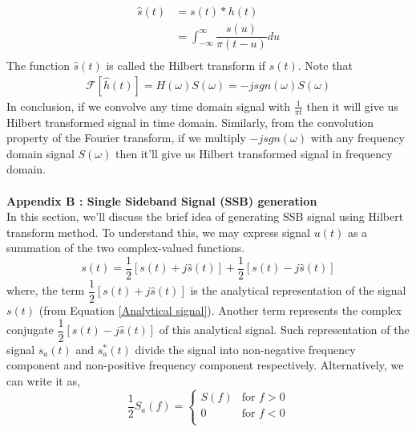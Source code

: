 \begin{equation}
\begin{split}
\hat{s}(t)&=s(t) * h(t)\\
		  &=\int_{-\infty}^{\infty} \dfrac{s(u)}{\pi(t-u)}du\\
\end{split}
\label{}
\end{equation}
The function $\hat{s}(t)$ is called the Hilbert transform if $s(t)$. Note that
\begin{equation}
\begin{split}
\mathcal{F}[\hat{h}(t)]=H(\omega)S(\omega)=-jsgn(\omega)S(\omega)
\end{split}
\label{}
\end{equation}
In conclusion, if we convolve any time domain signal with $\frac{1}{\pi t}$ then it will give us Hilbert transformed signal in time domain. Similarly, from the convolution property of the Fourier transform, if we multiply $-jsgn(\omega)$ with any frequency domain signal $S(\omega)$ then it'll give us Hilbert transformed signal in frequency domain.
\\
\\
\textbf{Appendix B : Single Sideband Signal (SSB) generation}\\
In this section, we'll discuss the brief idea of generating SSB signal using Hilbert transform method. To understand this, we may express signal $u(t)$ as a summation of the two complex-valued functions.
\begin{equation}
s(t)=\dfrac{1}{2}[s(t)+j\hat{s}(t)]+\dfrac{1}{2}[s(t)-j\hat{s}(t)]
\label{}
\end{equation}
where, the term $\dfrac{1}{2}[s(t)+j\hat{s}(t)]$ is the analytical representation of the signal $s(t)$ (from Equation \ref{Analytical signal}). Another term represents the complex conjugate $\dfrac{1}{2}[s(t)-j\hat{s}(t)]$ of this analytical signal. Such representation of the signal ${s_a}(t)$ and ${s_a^*}(t)$ divide the signal into non-negative frequency component and non-positive frequency component respectively. Alternatively, we can write it as,
\begin{equation}
\dfrac{1}{2}{S_a}(f) = \begin{cases}
S(f) &\text{for $f>0$}\\
0    &\text{for $f<0$}\\
\end{cases}
\end{equation}
